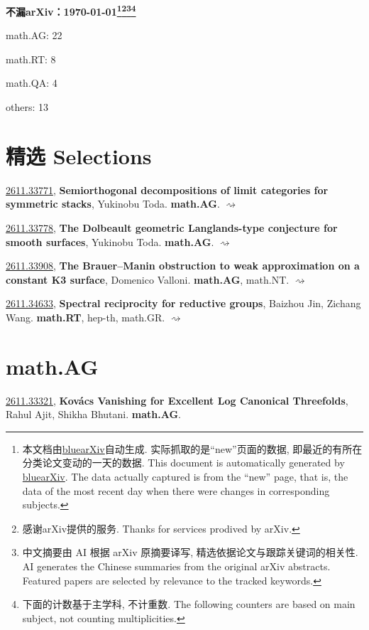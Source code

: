\documentclass[9pt, a4paper]{article}
\theoremstyle{plain}
\theoremstyle{definition}
\theoremstyle{remark}
\newcommand{\arxivwithtarget}[3]{\hypertarget{#1}{}\href{https://arxiv.org/abs/#1}{#1}, \textbf{\textcolor{arxivblue}{#2}}, #3. }
\newcommand{\arxiv}[3]{\href{https://arxiv.org/abs/#1}{#1}, \textbf{\textcolor{arxivblue}{#2}}, #3. }
\begin{document}
\begin{center}
    \Huge\textbf{不漏arXiv：\today \footnote{本文档由\href{https://github.com/vegetablefj/bluearXiv-ai}{bluearXiv}自动生成. 实际抓取的是``new''页面的数据, 即最近的有所在分类论文变动的一天的数据. This document is automatically generated by \href{https://github.com/vegetablefj/bluearXiv-ai}{bluearXiv}. The data actually captured is from the ``new'' page, that is, the data of the most recent day when there were changes in corresponding subjects.}\footnote{感谢arXiv提供的服务. Thanks for services prodived by arXiv.}\footnote{中文摘要由 AI 根据 arXiv 原摘要译写, 精选依据论文与跟踪关键词的相关性. AI generates the Chinese summaries from the original arXiv abstracts. Featured papers are selected by relevance to the tracked keywords.}\footnote{下面的计数基于主学科, 不计重数. The following counters are based on main subject, not counting multiplicities.}}
\end{center}

\begin{center}
math.AG: 22

math.RT: 8

math.QA: 4

others: 13

\end{center}

\setcounter{section}{-1}
\section{精选 Selections}
\arxiv{2611.33771}{Semiorthogonal decompositions of limit categories for symmetric stacks}{Yukinobu Toda}\textbf{math.AG}. \hyperlink{2611.33771}{$\rightsquigarrow$}

\arxiv{2611.33778}{The Dolbeault geometric Langlands-type conjecture for smooth surfaces}{Yukinobu Toda}\textbf{math.AG}. \hyperlink{2611.33778}{$\rightsquigarrow$}

\arxiv{2611.33908}{The Brauer--Manin obstruction to weak approximation on a constant K3 surface}{Domenico Valloni}\textbf{math.AG}, math.NT. \hyperlink{2611.33908}{$\rightsquigarrow$}

\arxiv{2611.34633}{Spectral reciprocity for reductive groups}{Baizhou Jin, Zichang Wang}\textbf{math.RT}, hep-th, math.GR. \hyperlink{2611.34633}{$\rightsquigarrow$}


\section{math.AG}
\arxivwithtarget{2611.33321}{Kovács Vanishing for Excellent Log Canonical Threefolds}{Rahul Ajit, Shikha Bhutani}\textbf{math.AG}.
\end{document}

